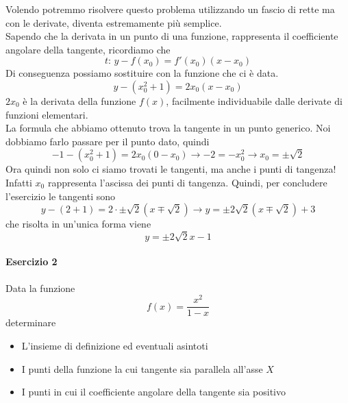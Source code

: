 Volendo potremmo risolvere questo problema utilizzando un fascio di rette ma con le derivate,
diventa estremamente più semplice.\\
Sapendo che la derivata in un punto di una funzione, rappresenta il coefficiente angolare
della tangente, ricordiamo che
\begin{equation*}
  t:\,y-f(x_0)=f'(x_0)(x-x_0)
\end{equation*}
Di conseguenza possiamo sostituire con la funzione che ci è data.
\begin{equation*}
  y-(x_0^2+1) = 2x_0(x-x_0)
\end{equation*}
$2x_0$ è la derivata della funzione $f(x)$, facilmente individuabile dalle derivate di funzioni
elementari.\\
La formula che abbiamo ottenuto trova la tangente in un punto generico. Noi dobbiamo farlo passare
per il punto dato, quindi
\begin{equation*}
  -1-(x_0^2+1)=2x_0(0-x_0) \rightarrow -2 = -x_0^2 \rightarrow x_0 = \pm \sqrt{2}
\end{equation*}
Ora quindi non solo ci siamo trovati le tangenti, ma anche i punti di tangenza! Infatti $x_0$
rappresenta l'ascissa dei punti di tangenza. Quindi, per concludere l'esercizio le tangenti
sono
\begin{equation*}
  y - (2+1) = 2\cdot\pm\sqrt{2}(x\mp\sqrt{2}) \rightarrow y = \pm2\sqrt{2}(x\mp\sqrt{2})+3
\end{equation*}
che risolta in un'unica forma viene
\begin{equation*}
  \boxed{y = \pm2\sqrt{2}x-1}
\end{equation*}

\paragraph{Esercizio 2}
Data la funzione
\begin{equation*}
  f(x) = \frac{x^2}{1-x}
\end{equation*}
determinare
\begin{itemize}
  \item L'insieme di definizione ed eventuali asintoti
  \item I punti della funzione la cui tangente sia parallela all'asse $X$
  \item I punti in cui il coefficiente angolare della tangente sia positivo
\end{itemize}
\divisor


